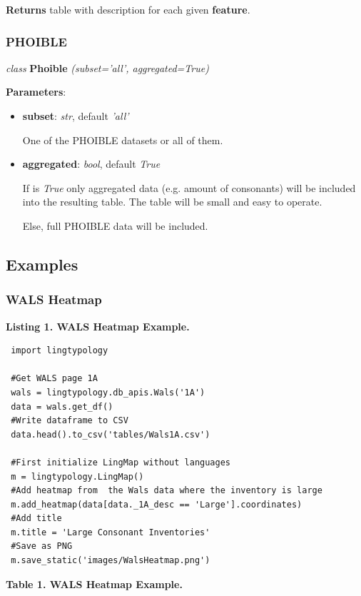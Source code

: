 \documentclass[a4paper,12pt]{article}
\begin{document}
\textbf{Returns} table with description for each given \textbf{feature}.

\subsubsection{PHOIBLE}

\textit{class} \textbf{Phoible} \textit{(subset='all', aggregated=True)}
\medskip

\textbf{Parameters}:
\begin{itemize}
 \item \textbf{subset}: \textit{str}, default \textit{'all'}
 
 One of the PHOIBLE datasets or all of them.
 \item \textbf{aggregated}: \textit{bool}, default \textit{True}
 
 If is \textit{True} only aggregated data (e.g. amount of consonants) will be included into the resulting table. The table will be small and easy to operate.
 
 Else, full PHOIBLE data will be included.
\end{itemize}


\subsection{Examples}

\subsubsection{WALS Heatmap}

\textbf{Listing 1. WALS Heatmap Example.}
\begin{lstlisting}
 import lingtypology

 #Get WALS page 1A
 wals = lingtypology.db_apis.Wals('1A')
 data = wals.get_df()
 #Write dataframe to CSV
 data.head().to_csv('tables/Wals1A.csv')
 
 #First initialize LingMap without languages
 m = lingtypology.LingMap()
 #Add heatmap from  the Wals data where the inventory is large
 m.add_heatmap(data[data._1A_desc == 'Large'].coordinates)
 #Add title
 m.title = 'Large Consonant Inventories'
 #Save as PNG
 m.save_static('images/WalsHeatmap.png')
\end{lstlisting}

\textbf{Table 1. WALS Heatmap Example.}
\end{document}
